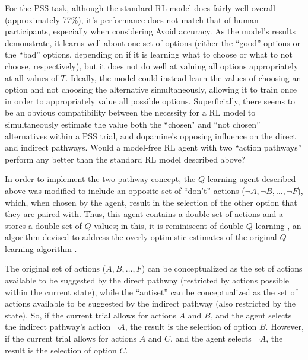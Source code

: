 \documentclass[10pt,letterpaper]{article}
\begin{document}
For the PSS task, although the standard RL model does fairly well overall (approximately 77\%), it's performance does not match that of human participants, especially when considering Avoid accuracy. As the model's results demonstrate, it learns well about one set of options (either the ``good'' options or the ``bad'' options, depending on if it is learning what to choose or what to not choose, respectively), but it does not do well at valuing all options appropriately at all values of $T$. Ideally, the model could instead learn the values of choosing an option and not choosing the alternative simultaneously, allowing it to train once in order to appropriately value all possible options. Superficially, there seems to be an obvious compatibility between the necessity for a RL model to simultaneously estimate the value both the ``chosen" and ``not chosen'' alternatives within a PSS trial, and dopamine's opposing influence on the direct and indirect pathways. Would a model-free RL agent with two ``action pathways'' perform any better than the standard RL model described above?

In order to implement the two-pathway concept, the $Q$-learning agent described above was modified to include an opposite set of ``don't'' actions ($\neg A, \neg B, \dots, \neg F$), which, when chosen by the agent, result in the selection of the other option that they are paired with. Thus, this agent contains a double set of actions and a stores a double set of $Q$-values; in this, it is reminiscent of double $Q$-learning \cite{hasselt2010double,van2016deep}, an algorithm devised to address the overly-optimistic estimates of the original $Q$-learning algorithm \cite{watkins1992q}.

The original set of actions ($A, B, \dots, F$) can be conceptualized as the set of actions available to be suggested by the direct pathway (restricted by actions possible within the current state), while the ``antiset'' can be conceptualized as the set of actions available to be suggested by the indirect pathway (also restricted by the state). So, if the current trial allows for actions $A$ and $B$, and the agent selects the indirect pathway's action $\neg A$, the result is the selection of option $B$. However, if the current trial allows for actions $A$ and $C$, and the agent selects $\neg A$, the result is the selection of option $C$.
\end{document}
